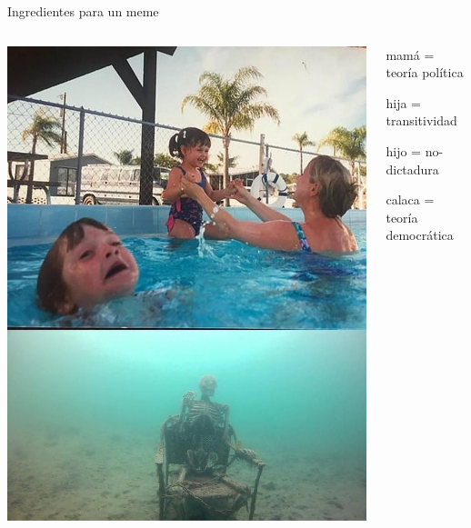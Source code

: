 \documentclass[bigger]{beamer}
\begin{document}
\begin{frame}[label={sec:org2759837}]{Ingredientes para un meme}
\begin{columns}
\begin{column}{0.5\columnwidth}
\includegraphics[width=.85\textwidth]{./pics/kids-in-pool-meme.jpg} 
\end{column}
\begin{column}{0.5\columnwidth}
mamá = teoría política 

hija = transitividad 

hijo = no-dictadura 

calaca = teoría democrática
\end{column}
\end{columns}
\end{frame}
\end{document}

